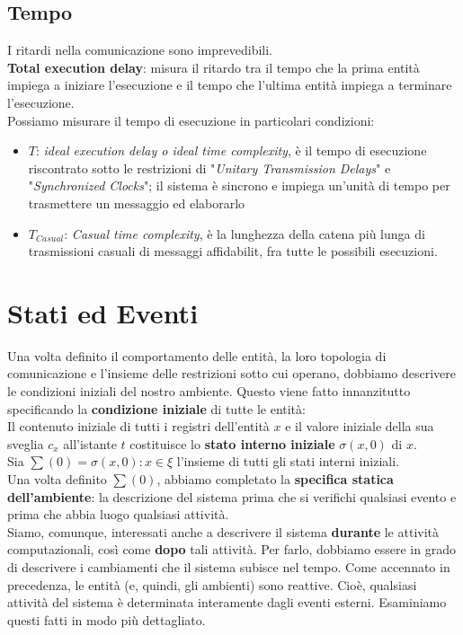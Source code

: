 \subsection{Tempo}
I ritardi nella comunicazione sono imprevedibili.\\
\textbf{Total execution delay}: misura il ritardo tra il tempo che la prima
entità impiega a iniziare l'esecuzione e il tempo che l'ultima entità impiega a
terminare l'esecuzione.\\
Possiamo misurare il tempo di esecuzione in particolari condizioni:
\begin{itemize}
    \item \textbf{$T$}: \textit{ideal execution delay o ideal time complexity}, è
          il tempo di esecuzione riscontrato sotto le restrizioni di "\textit{Unitary
              Transmission Delays}" e "\textit{Synchronized Clocks}"; il sistema è sincrono
          e impiega un'unità di tempo per trasmettere un messaggio ed elaborarlo
    \item \textbf{$T_{Casual}$}: \textit{Casual time complexity}, è la lunghezza
          della catena più lunga di trasmissioni casuali di messaggi affidabilit, fra
          tutte le possibili esecuzioni.
\end{itemize}

\section{Stati ed Eventi}
Una volta definito il comportamento delle entità, la loro topologia di
comunicazione e l'insieme delle restrizioni sotto cui operano, dobbiamo
descrivere le condizioni iniziali del nostro ambiente. Questo viene fatto
innanzitutto specificando la \textbf{condizione iniziale} di tutte le entità:\\
Il contenuto iniziale di tutti i registri dell'entità $x$ e il valore iniziale
della sua sveglia $c_x$ all'istante $t$ costituisce lo \textbf{stato interno
    iniziale} $\sigma (x, 0)$ di $x$.\\
Sia $\sum(0) = {\sigma (x, 0) : x \in \xi}$ l'insieme di tutti gli stati interni
iniziali.\\
Una volta definito $\sum(0)$, abbiamo completato la \textbf{specifica statica
    dell'ambiente}: la descrizione del sistema prima che si verifichi qualsiasi
evento e prima che abbia luogo qualsiasi attività.\\
Siamo, comunque, interessati anche a descrivere il sistema \textbf{durante} le
attività computazionali, così come \textbf{dopo} tali attività. Per farlo,
dobbiamo essere in grado di descrivere i cambiamenti che il sistema subisce nel
tempo. Come accennato in precedenza, le entità (e, quindi, gli ambienti) sono
reattive. Cioè, qualsiasi attività del sistema è determinata interamente dagli
eventi esterni. Esaminiamo questi fatti in modo più dettagliato.

